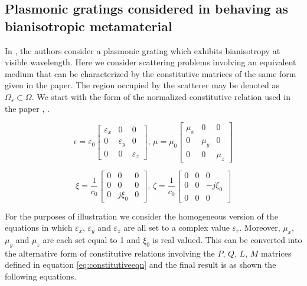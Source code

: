 \subsection{Plasmonic gratings considered in \cite{pendry2016acsphotonics} behaving as bianisotropic metamaterial}
In  \cite{pendry2016acsphotonics}, the authors consider a plasmonic grating 
which exhibits bianisotropy at visible wavelength.
Here we consider scattering problems involving an equivalent medium 
that can be characterized by the constitutive matrices of the same form 
given in the paper.
The region occupied by the scatterer may be denoted as $\Omega_s \subset \Omega$. 
We start with the form of the normalized constitutive relation used in the paper
\cite{chen2005retrieval}, \cite{li2009determination}. 

\begin{equation}
\epsilon = \varepsilon_0
\begin{bmatrix}
\varepsilon_x & 0 & 0\\
0 & \varepsilon_y & 0\\
0 & 0 & \varepsilon_z 
\end{bmatrix}, \,
\mu =  \mu_0
\begin{bmatrix}
\mu_x & 0 & 0\\
0 & \mu_y & 0\\
0 & 0 & \mu_z
\end{bmatrix}
\end{equation}

\begin{equation}
\xi= \frac{1}{c_0}
\begin{bmatrix}
0 & 0 & 0\\
0 & 0 & 0\\
0 & j\xi_0 & 0
\end{bmatrix}, \,
\zeta =  \frac{1}{c_0}
\begin{bmatrix}
0 & 0 & 0\\
0 & 0 & -j\xi_0\\
0 & 0 & 0
\end{bmatrix}
\end{equation}

For the purposes of illustration we consider the homogeneous version 
of the equations in which $\varepsilon_x$, $\varepsilon_y$ and $\varepsilon_z$ 
are all set to a complex value $\varepsilon_r$.
Moreover, $\mu_x$, $\mu_y$ and $\mu_z$ are each set equal to 1 and $\xi_0$ is real valued.
This can be converted into the alternative form of constitutive relations \cite{noiregolarita}  
involving the $P$, $Q$, $L$, $M$ matrices defined in equation \eqref{eq:constitutiveeqn} 
and the final result is as shown the following equations.

